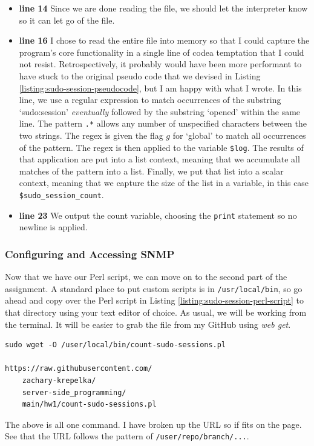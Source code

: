 \documentclass{article}
\begin{document}
\begin{itemize}[leftmargin=*]
	\item

		\textbf{line 14} Since we are done reading the file, we should
		let the interpreter know so it can let go of the file.

	\item

		\textbf{line 16} I chose to read the entire file into memory so
		that I could capture the program's core functionality in a
		single line of code\textemdash a temptation that I could not
		resist.  Retrospectively, it probably would have been more
		performant to have stuck to the original pseudo code that we
		devised in Listing \ref{listing:sudo-session-pseudocode}, but I
		am happy with what I wrote. In this line, we use a regular
		expression to match occurrences of the substring `sudo:session'
		\emph{eventually} followed by the substring `opened' within the
		same line. The pattern \verb|.*| allows any number of
		unspecified characters between the two strings.  The regex is
		given the flag $g$ for `global' to match all occurrences of the
		pattern. The regex is then applied to the variable \verb|$log|.
		The results of that application are put into a list context,
		meaning that we accumulate all matches of the pattern into a
		list.  Finally, we put that list into a scalar context, meaning
		that we capture the size of the list in a variable, in this case
		\verb|$sudo_session_count|.

	\item

		\textbf{line 23} We output the count variable, choosing the
		\verb|print| statement so no newline is applied.

\end{itemize}

\subsubsection{Configuring and Accessing SNMP}

Now that we have our Perl script, we can move on to the second part of the
assignment. A standard place to put custom scripts is in \verb|/usr/local/bin|,
so go ahead and copy over the Perl script in Listing
\ref{listing:sudo-session-perl-script} to that directory using your text editor
of choice. As usual, we will be working from the terminal.
%
%
It will be easier to grab the file from my GitHub using \emph{web get}.
%
\begin{verbatim}
sudo wget -O /user/local/bin/count-sudo-sessions.pl 

https://raw.githubusercontent.com/
	zachary-krepelka/
	server-side_programming/
	main/hw1/count-sudo-sessions.pl
\end{verbatim}
%
The above is all one command.  I have broken up the URL so if fits on the page.
See that the URL follows the pattern of \verb|/user/repo/branch/...|.
\end{document}
